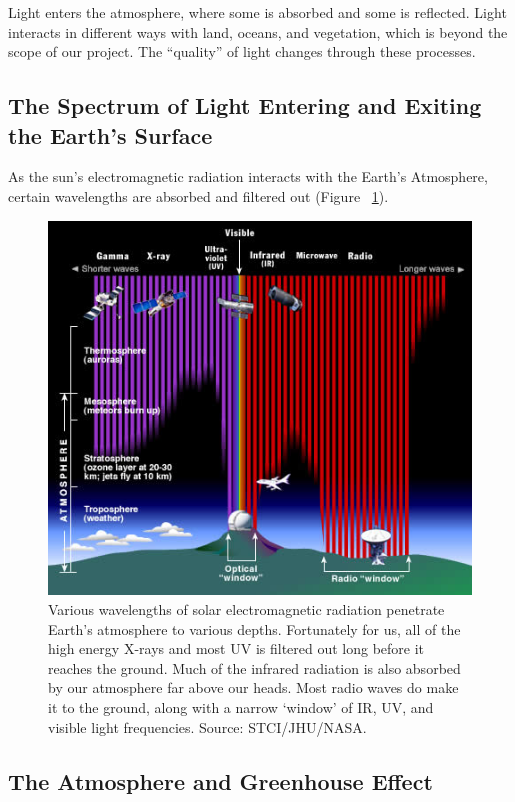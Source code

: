 \documentclass{book}\usepackage{knitr}
\begin{document}
Light enters the atmosphere, where some is absorbed and some is reflected. Light interacts in different ways with land, oceans, and vegetation, which is beyond the scope of our project. The ``quality'' of light changes through these processes. 

\subsection{The Spectrum of Light Entering and Exiting the Earth's Surface}

As the sun's electromagnetic radiation interacts with the Earth's Atmosphere, certain wavelengths are absorbed and filtered out (Figure~ \ref{fig:em-entering}).

\begin{figure}
\includegraphics[width=\linewidth]{images/earth-system/em-radiation-atmosph-depth-stsci.jpg}
\caption{Various wavelengths of solar electromagnetic radiation penetrate Earth's atmosphere to various depths. Fortunately for us, all of the high energy X-rays and most UV is filtered out long before it reaches the ground. Much of the infrared radiation is also absorbed by our atmosphere far above our heads. Most radio waves do make it to the ground, along with a narrow `window' of IR, UV, and visible light frequencies. Source: STCI/JHU/NASA.}
\label{fig:em-entering}
\end{figure}

\subsection{The Atmosphere and Greenhouse Effect}
\end{document}
